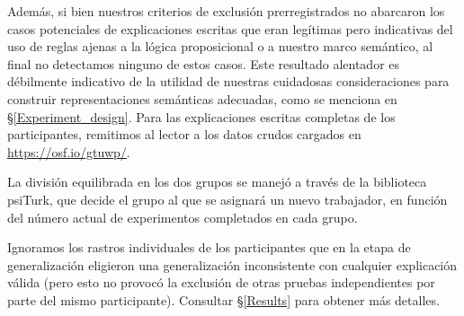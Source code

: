 Además, si bien nuestros criterios de exclusión prerregistrados no abarcaron los casos potenciales de explicaciones escritas que eran legítimas pero indicativas del uso de reglas ajenas a la lógica proposicional o a nuestro marco semántico, al final no detectamos ninguno de estos casos. Este resultado alentador es débilmente indicativo de la utilidad de nuestras cuidadosas consideraciones para construir representaciones semánticas adecuadas, como se menciona en \S\ref{Experiment_design}. Para las explicaciones escritas completas de los participantes, remitimos al lector a los datos crudos cargados en \url{https://osf.io/gtuwp/}.

La división equilibrada en los dos grupos se manejó a través de la biblioteca psiTurk, que decide el grupo al que se asignará un nuevo trabajador, en función del número actual de experimentos completados en cada grupo.

Ignoramos los rastros individuales de los participantes que en la etapa de generalización eligieron una generalización inconsistente con cualquier explicación válida (pero esto no provocó la exclusión de otras pruebas independientes por parte del mismo participante). Consultar \S\ref{Results} para obtener más detalles.

